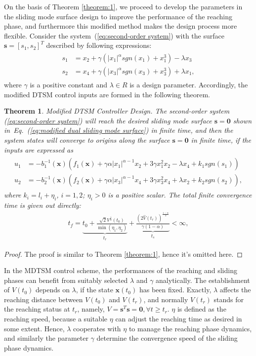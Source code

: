 \documentclass[3p]{elsarticle}
\theoremstyle{plain}
\newtheorem{mythm}{Theorem}
\theoremstyle{remark}
\begin{document}
On the basis of Theorem \ref{theorem:1}, we proceed to develop the parameters in the sliding mode  surface design to improve the performance of the reaching phase, and furthermore this modified method makes the design process more flexible. Consider the system~(\ref{eq:second-order system}) with the surface $\bm s = [s_1,s_2]^T$ described by following expressions:
\begin{align}
\begin{split}
s_1 &= x_2+\gamma(\vert x_1\vert^{\alpha} sgn(x_1)+x_1^3)-\lambda x_3\\
s_2 &= x_4+\gamma(\vert x_3\vert^{\alpha} sgn(x_3)+x_3^3)+\lambda x_1,\label{eq:modified dual sliding mode  surface}
\end{split}
\end{align}
where $\gamma$ is a positive constant and $\lambda\in R$ is a design parameter. Accordingly, the modified DTSM control inputs are formed in the following theorem.
\begin{mythm}\label{theorem:2}Modified DTSM Controller Design.
The second-order system (\ref{eq:second-order system}) will reach the desired sliding mode  surface $\bm s = \bm 0$ shown in~Eq.~(\ref{eq:modified dual sliding mode  surface}) in finite time, and then the system states will converge to origins along the surface $\bm s=\bm 0$ in finite time, if the inputs are expressed as
\begin{align}
\begin{split}
u_1 &= -b_1^{-1}(\bm x)(f_1(\bm x)+\gamma\alpha\vert x_1\vert^{\alpha-1}x_2+3\gamma x_1^2x_2-\lambda x_4+k_1sgn(s_1))\\
u_2 &= -b_2^{-1}(\bm x)(f_2(\bm x)+\gamma\alpha\vert x_3\vert^{\alpha-1}x_4+3\gamma x_3^2x_4+\lambda x_2+k_2sgn(s_2)),\label{eq:modified input}
\end{split}
\end{align}
where $k_i = l_i+\eta_i$, $i=1,2$; $\eta_i>0$ is a positive scalar. The total finite convergence time is given out directly:
\begin{align}
t_f = \underbrace{t_0+\frac{\sqrt{2}V^{\frac{1}{2}}(t_0)}{\min(\eta_1,\eta_2)}}_{t_r}+\underbrace{\frac{(2\hat V(t_r))^{\frac{1-\alpha}{2}}}{\gamma(1-\alpha)}}_{t_s}<\infty,\label{eq:total convergence time}
\end{align}
\end{mythm}
\begin{proof}
The proof is similar to Theorem \ref{theorem:1}, hence it's omitted here.
\end{proof}
In the MDTSM control scheme, the performances of the reaching and sliding phases can benefit from suitably selected $\lambda$ and $\gamma$ analytically. The establishment of $V(t_0)$ depends on $\lambda$, if the state $\bm x(t_0)$ has been fixed. Exactly, $\lambda$ affects the reaching distance between $V(t_0)$ and $V(t_r)$, and normally $V(t_r)$ stands for the reaching status at $t_r$, namely, $V=\bm s^T\bm s = \bm 0,\forall t\ge t_r$. $\eta$ is defined as the reaching speed, because a suitable $\eta$ can adjust the reaching time as desired in some extent. Hence, $\lambda$ cooperates with $\eta$ to manage the reaching phase dynamics, and similarly the parameter $\gamma$ determine the convergence speed of the sliding phase dynamics.
\end{document}
